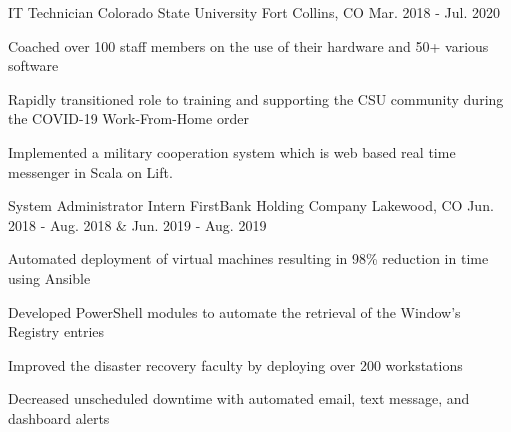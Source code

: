 \begin{cventries}
  \cventry
    {IT Technician} %
    {Colorado State University} %
    {Fort Collins, CO} %
    {Mar. 2018 - Jul. 2020} %
    {
      \begin{cvitems} %
        \item {Coached over 100 staff members on the use of their hardware and 50+ various software}
        \item {Rapidly transitioned role to training and supporting the CSU community during the COVID-19 Work-From-Home order}
        \item {Implemented a military cooperation system which is web based real time messenger in Scala on Lift.}
      \end{cvitems}
    }

  \cventry
    {System Administrator Intern} %
    {FirstBank Holding Company} %
    {Lakewood, CO} %
    {Jun. 2018 - Aug. 2018 \& Jun. 2019 - Aug. 2019} %
    {
      \begin{cvitems} %
        \item {Automated deployment of virtual machines resulting in 98\% reduction in time using Ansible}
        \item {Developed PowerShell modules to automate the retrieval of the Window’s Registry entries}
        \item {Improved the disaster recovery faculty by deploying over 200 workstations}
        \item {Decreased unscheduled downtime with automated email, text message, and dashboard alerts}
      \end{cvitems}
    }
    

\end{cventries}
